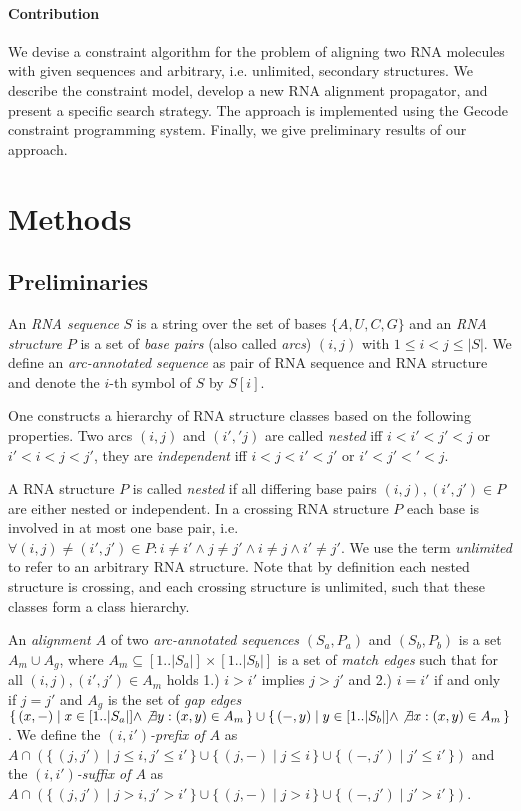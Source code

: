 \documentclass[11pt]{llncs}
\newcommand*{\PSET}[2]{\{\,#1\mid#2\,\}}
\begin{document}
\paragraph{Contribution} We devise a constraint algorithm for the
problem of aligning two RNA molecules with given sequences and
arbitrary, i.e. unlimited, secondary structures. We describe the
constraint model, develop a new RNA alignment propagator, and present
a specific search strategy. The approach is implemented using the
Gecode constraint programming system. Finally, we give preliminary
results of our approach.

\section{Methods}

\subsection{Preliminaries}
An \emph{RNA sequence} $S$ is a string over the set of bases
$\{A,U,C,G\}$ and an \emph{RNA structure} $P$ is a set of \emph{base
  pairs} (also called \emph{arcs}) $(i,j)$ with $1 \leq i< j \leq
|S|$. We define an \emph{arc-annotated sequence} as pair of RNA sequence
and RNA structure and denote the $i$-th symbol of $S$ by $S[i]$.

One constructs a hierarchy of RNA structure classes based on the
following properties. Two arcs $(i,j)$ and $(i','j)$ are called
\emph{nested} iff $i<i'<j'<j$ or $i'<i<j<j'$, they are
\emph{independent} iff $i<j<i'<j'$ or $i'<j'<'<j$.

A RNA structure $P$ is called \emph{nested} if all differing base
pairs $(i,j),(i',j')\in P$ are either nested or independent.  In a
crossing RNA structure $P$ each base is involved in at most one base
pair, i.e. $\forall (i,j)\neq(i',j')\in P: i\neq i' \land j\neq j'
\land i\neq j \land i'\neq j'$. We use the term \emph{unlimited} to
refer to an arbitrary RNA structure. Note that by definition each
nested structure is crossing, and each crossing structure is
unlimited, such that these classes form a class hierarchy.

An \emph{alignment $A$} of two \emph{arc-annotated sequences}
$(S_a,P_a)$ and $(S_b,P_b)$ is a set $A_m\cup A_g$, where
$A_m\subseteq [1..|S_a|] \times [1..|S_b|]$ is a set of \emph{match
  edges} such that for all $(i,j),(i',j')\in A_m$ holds 1.) $i>i'$
implies $j>j'$ and 2.)  $i=i'$ if and only if $j=j'$ and $A_g$ is the
set of \emph{gap edges} $\PSET{(x,-)}{x\in [1..|S_a|]\land \not\exists
  y: (x,y)\in A_m}\cup\PSET{(-,y)}{y\in [1..|S_b|]\land \not\exists x:
  (x,y)\in A_m}$.
%
We define the \emph{$(i,i')$-prefix of $A$} as
$A\cap(\PSET{(j,j')}{j\leq i,j'\leq i'}\cup\PSET{(j,-)}{j\leq i}\cup\PSET{(-,j')}{j'\leq i'})$
and the  \emph{$(i,i')$-suffix of $A$} as
$A\cap(\PSET{(j,j')}{j>i,j'>i'}\cup\PSET{(j,-)}{j>i}\cup\PSET{(-,j')}{j'>i'})$.
\end{document}

